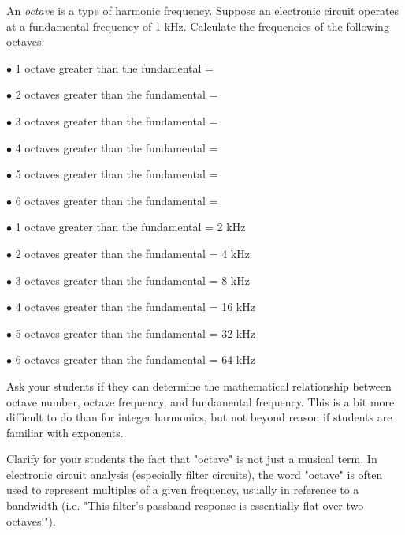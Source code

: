 

An {\it octave} is a type of harmonic frequency.  Suppose an electronic circuit operates at a fundamental frequency of 1 kHz.  Calculate the frequencies of the following octaves:

\medskip
\item{$\bullet$} 1 octave greater than the fundamental = 
\item{$\bullet$} 2 octaves greater than the fundamental = 
\item{$\bullet$} 3 octaves greater than the fundamental = 
\item{$\bullet$} 4 octaves greater than the fundamental = 
\item{$\bullet$} 5 octaves greater than the fundamental = 
\item{$\bullet$} 6 octaves greater than the fundamental = 
\medskip







\medskip
\item{$\bullet$} 1 octave greater than the fundamental = 2 kHz
\item{$\bullet$} 2 octaves greater than the fundamental = 4 kHz
\item{$\bullet$} 3 octaves greater than the fundamental = 8 kHz
\item{$\bullet$} 4 octaves greater than the fundamental = 16 kHz
\item{$\bullet$} 5 octaves greater than the fundamental = 32 kHz
\item{$\bullet$} 6 octaves greater than the fundamental = 64 kHz
\medskip







Ask your students if they can determine the mathematical relationship between octave number, octave frequency, and fundamental frequency.  This is a bit more difficult to do than for integer harmonics, but not beyond reason if students are familiar with exponents.

Clarify for your students the fact that "octave" is not just a musical term.  In electronic circuit analysis (especially filter circuits), the word "octave" is often used to represent multiples of a given frequency, usually in reference to a bandwidth (i.e. "This filter's passband response is essentially flat over two octaves!").




